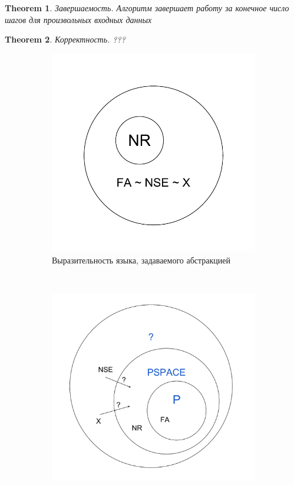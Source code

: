 \documentclass[10pt]{article}
\newtheorem{theorem}{Theorem}
\begin{document}
	\begin{theorem}{Завершаемость.}
		Алгоритм завершает работу за конечное число шагов для произвольных входных данных
	\end{theorem}
	
	\begin{theorem}{Корректность.}
		???
	\end{theorem}

	\begin{figure}[h!]
		\begin{subfigure}[t]{0.45\textwidth}
			\includegraphics[width=\textwidth]{pictures/lang}
			\caption{Выразительность языка, задаваемого абстракцией}
			\label{circle:lang}
		\end{subfigure}
		~
		\begin{subfigure}[t]{0.45\textwidth}
			\includegraphics[width=\textwidth]{pictures/intersec_problem}

\end{subfigure}
\end{figure}
\end{document}
